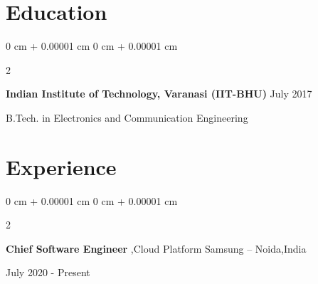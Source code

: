 \documentclass[10pt, a4paper]{article}
\newenvironment{highlights}{
    \begin{itemize}[
        topsep=0.10 cm,
        parsep=0.10 cm,
        partopsep=0pt,
        itemsep=0pt,
        leftmargin=0 cm + 10pt
    ]
}{
    \end{itemize}
} %
\newenvironment{onecolentry}{
    \begin{adjustwidth}{
        0 cm + 0.00001 cm
    }{
        0 cm + 0.00001 cm
    }
}{
    \end{adjustwidth}
} %
\newenvironment{twocolentry}[2][]{
    \onecolentry
    \def\secondColumn{#2}
    \setcolumnwidth{\fill, 4.5 cm}
    \begin{paracol}{2}
}{
    \switchcolumn \raggedleft \secondColumn
    \end{paracol}
    \endonecolentry
} %
\begin{document}
        
    \section{Education}
        
        \begin{twocolentry}{
            July 2017}
            \textbf{Indian Institute of Technology, Varanasi (IIT-BHU)}\end{twocolentry}
            \hspace{5mm}B.Tech. in Electronics and Communication Engineering



    \section{Experience}

        \begin{twocolentry}{
            July 2020 - Present
        }
            \textbf{Chief Software Engineer },Cloud Platform Samsung -- Noida,India
        \end{twocolentry}

        \vspace{0.10 cm}
\end{document}
